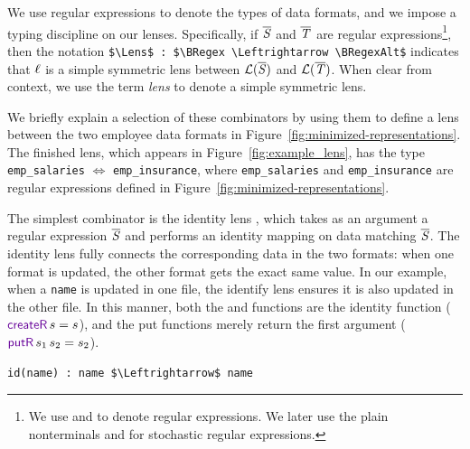 \documentclass[acmsmall,screen,anonymous]{acmart}
\begin{document}
We use regular expressions to denote the types of data formats, and we impose a
typing discipline on our lenses. Specifically, if $\overline{\mathit{S}}$ and $\overline{\mathit{T}}$ are
regular expressions\footnote{We use \BRegex and \BRegexAlt to denote regular
  expressions. We later use the plain nonterminals \Regex and \RegexAlt for
  stochastic regular expressions.}, then the notation
\lstinline{$\Lens$ : $\BRegex \Leftrightarrow \BRegexAlt$} indicates that $\mathit{\ell}$ is a simple symmetric lens between $\mathcal{L}(\overline{\mathit{S}})$ and $\mathcal{L}(\overline{\mathit{T}})$. When clear from context, we use the term \textit{lens} to denote a simple symmetric lens.

We briefly explain a selection of these
combinators by using them to define a lens between the two employee data formats
in Figure~\ref{fig:minimized-representations}. The finished lens, which appears
in Figure~\ref{fig:example_lens}, has the type
\lstinline{emp_salaries} $\Leftrightarrow$
\lstinline{emp_insurance}, where
\lstinline{emp_salaries} and
\lstinline{emp_insurance} are regular expressions defined in Figure~\ref{fig:minimized-representations}.


The simplest combinator is the identity lens \IdentityLens, which takes as an
argument a regular expression $\overline{\mathit{S}}$ and performs an identity mapping on data
matching $\overline{\mathit{S}}$. The identity lens fully connects the
corresponding data in the two formats: when one format is
updated, the other format gets the exact same value. In our example,
when a \lstinline{name} is updated in one file, the identify lens ensures it is
also updated in the other file. In this manner, both the \CreateR and \CreateL
functions are the identity function ($\CreateR \App s = s$), and the put
functions merely return the first argument ($\PutROf{s_1}{s_2} = s_2$).

%
\begin{lstlisting}
id(name) : name $\Leftrightarrow$ name
\end{lstlisting}
%
\end{document}

